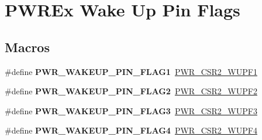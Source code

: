 \hypertarget{group___p_w_r_ex___wakeup___pins___flag}{}\section{P\+W\+R\+Ex Wake Up Pin Flags}
\label{group___p_w_r_ex___wakeup___pins___flag}
\subsection*{Macros}
\begin{DoxyCompactItemize}
\item 
\mbox{\label{group___p_w_r_ex___wakeup___pins___flag_gad86d2054dea114939435fa100026b989}} 
\#define {\bfseries P\+W\+R\+\_\+\+W\+A\+K\+E\+U\+P\+\_\+\+P\+I\+N\+\_\+\+F\+L\+A\+G1}~\mbox{\hyperlink{group___peripheral___registers___bits___definition_ga25f6a2abbccc4b65e1b531618927e71a}{P\+W\+R\+\_\+\+C\+S\+R2\+\_\+\+W\+U\+P\+F1}}
\item 
\mbox{\label{group___p_w_r_ex___wakeup___pins___flag_gaa2032c698a41da40fa67d2bf8bdba140}} 
\#define {\bfseries P\+W\+R\+\_\+\+W\+A\+K\+E\+U\+P\+\_\+\+P\+I\+N\+\_\+\+F\+L\+A\+G2}~\mbox{\hyperlink{group___peripheral___registers___bits___definition_ga4ac752e520a530f84556121ae2685f47}{P\+W\+R\+\_\+\+C\+S\+R2\+\_\+\+W\+U\+P\+F2}}
\item 
\mbox{\label{group___p_w_r_ex___wakeup___pins___flag_ga73135bec9bd69360f563397e3b267f07}} 
\#define {\bfseries P\+W\+R\+\_\+\+W\+A\+K\+E\+U\+P\+\_\+\+P\+I\+N\+\_\+\+F\+L\+A\+G3}~\mbox{\hyperlink{group___peripheral___registers___bits___definition_gaa772158df6f3f266a40fc11c91a1f44d}{P\+W\+R\+\_\+\+C\+S\+R2\+\_\+\+W\+U\+P\+F3}}
\item 
\mbox{\label{group___p_w_r_ex___wakeup___pins___flag_ga3d1e5cee9ea5823579f4b95cc000dc10}} 
\#define {\bfseries P\+W\+R\+\_\+\+W\+A\+K\+E\+U\+P\+\_\+\+P\+I\+N\+\_\+\+F\+L\+A\+G4}~\mbox{\hyperlink{group___peripheral___registers___bits___definition_ga77b2db21ff7703a92fcc462a771041a1}{P\+W\+R\+\_\+\+C\+S\+R2\+\_\+\+W\+U\+P\+F4}}
\item 
\mbox{\label{group___p_w_r_ex___wakeup___pins___flag_gaeb8bc3c792eab9e2b8f01b466bb0a42b}} 

\end{DoxyCompactItemize}
